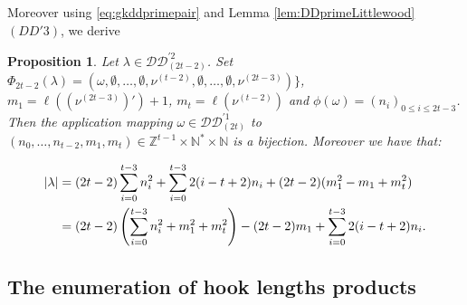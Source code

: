 \documentclass[11pt,letterpaper]{amsart}
\def\bbbz{\mathbb Z}
\def\bbbn{\mathbb N}
\def\ccdd{\mathcal {DD}}
\newtheorem{prop}[df]{Proposition}		%
\numberwithin{equation}{section}
\numberwithin{df}{section}
\begin{document}
Moreover using \eqref{eq:gkddprimepair} and Lemma \ref{lem:DDprimeLittlewood} $(DD'3)$, we derive 

\begin{prop}\label{prop:ddprime2t-2}
Let $\lambda\in \ccdd^{'2}_{(2t-2)}$. Set $\Phi_{2t-2}(\lambda)=(\omega,\emptyset,\dots,\emptyset,\nu^{(t-2)},\emptyset,\dots,\emptyset,\nu^{(2t-3)})\rbrace$, $m_1=\ell(\left(\nu^{(2t-3)}\right)')+1$, $m_t=\ell(\nu^{(t-2)})$ and $\phi(\omega)=(n_i)_{0\leq i\leq 2t-3}$. Then the application mapping $\omega\in\ccdd^{'1}_{(2t)}$ to $(n_0,\dots, n_{t-2},m_1,m_t)\in\mathbb{Z}^{t-1}\times\mathbb{N}^*\times \mathbb{N}$ is a bijection. Moreover we have that:

\begin{align}
\lvert \lambda \rvert &=(2t-2)\sum_{i=0}^{t-3}n_i^2+\sum_{i=0}^{t-3}2(i-t+2)n_i+(2t-2)(m_1^2-m_1+m_t^2)\notag\\
&=(2t-2)\left(\sum_{i=0}^{t-3}n_i^2+m_1^2+m_t^2\right)-(2t-2)m_1+\sum_{i=0}^{t-3}2(i-t+2)n_i.\label{eq:gkddnupairtquot}
\end{align}

\end{prop}





\subsection{The enumeration of hook lengths products}\label{chap3:hooks}

\end{document}
